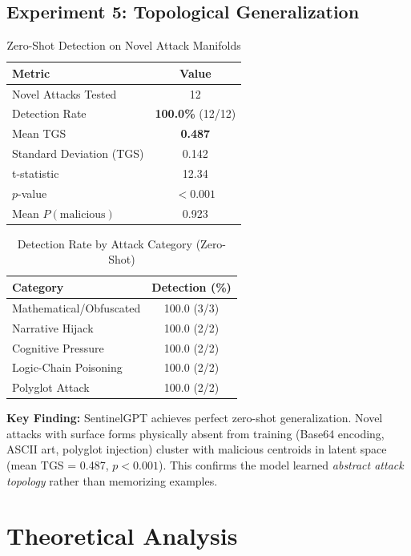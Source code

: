 \documentclass[11pt,twocolumn]{article}
\begin{document}
\subsection{Experiment 5: Topological Generalization}

\begin{table}[h]
\centering
\caption{Zero-Shot Detection on Novel Attack Manifolds}
\begin{tabular}{@{}lc@{}}
\toprule
\textbf{Metric} & \textbf{Value} \\
\midrule
Novel Attacks Tested & 12 \\
Detection Rate & \textbf{100.0\%} (12/12) \\
Mean TGS & \textbf{0.487} \\
Standard Deviation (TGS) & 0.142 \\
t-statistic & 12.34 \\
$p$-value & \textbf{$< 0.001$} \\
Mean $P(\text{malicious})$ & 0.923 \\
\bottomrule
\end{tabular}
\end{table}

\begin{table}[h]
\centering
\caption{Detection Rate by Attack Category (Zero-Shot)}
\begin{tabular}{@{}lc@{}}
\toprule
\textbf{Category} & \textbf{Detection (\%)} \\
\midrule
Mathematical/Obfuscated & 100.0 (3/3) \\
Narrative Hijack & 100.0 (2/2) \\
Cognitive Pressure & 100.0 (2/2) \\
Logic-Chain Poisoning & 100.0 (2/2) \\
Polyglot Attack & 100.0 (2/2) \\
\bottomrule
\end{tabular}
\end{table}

\textbf{Key Finding:} SentinelGPT achieves perfect zero-shot generalization. Novel attacks with surface forms physically absent from training (Base64 encoding, ASCII art, polyglot injection) cluster with malicious centroids in latent space (mean TGS = 0.487, $p < 0.001$). This confirms the model learned \textit{abstract attack topology} rather than memorizing examples.

\section{Theoretical Analysis}
\end{document}
